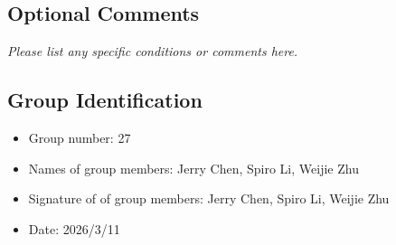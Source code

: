 \documentclass{article}
\begin{document}
\subsection*{Optional Comments}
\textit{Please list any specific conditions or comments here.}

\subsection*{Group Identification}

\begin{itemize}
	\item Group number: 27
	\item Names of group members: Jerry Chen, Spiro Li, Weijie Zhu
	\item Signature of of group members: Jerry Chen, Spiro Li, Weijie Zhu
	\item Date: 2026/3/11
\end{itemize}
\end{document}
